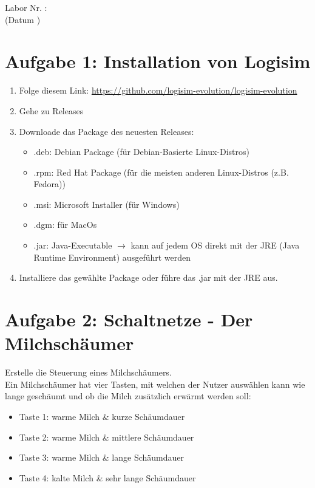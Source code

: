 \documentclass[a4paper]{scrartcl}
\def\header#1#2{
  \begin{center}
    {\Large Labor #1: \TOPIC}\\
    {(Datum #2)}
  \end{center}
}
\begin{document}
\header{Nr. \NUMBER}{\DATE}



\section*{Aufgabe 1: Installation von Logisim}
\begin{enumerate}
	\item Folge diesem Link: \href{https://github.com/logisim-evolution/logisim-evolution}{https://github.com/logisim-evolution/logisim-evolution}
	\item Gehe zu Releases
	\item Downloade das Package des neuesten Releases:
	\begin{itemize}
		\item .deb: Debian Package (für Debian-Basierte Linux-Distros)
		\item .rpm: Red Hat Package (für die meisten anderen Linux-Distros (z.B. Fedora))
		\item .msi: Microsoft Installer (für Windows)
		\item .dgm: für MacOs
		\item .jar: Java-Executable $\rightarrow$ kann auf jedem OS direkt mit der JRE (Java Runtime Environment) ausgeführt werden
	\end{itemize}
	\item Installiere das gewählte Package oder führe das .jar mit der JRE aus.
\end{enumerate}

\section*{Aufgabe 2: Schaltnetze - Der Milchschäumer}
Erstelle die Steuerung eines Milchschäumers. \\
Ein Milchschäumer hat vier Tasten, mit welchen der Nutzer auswählen kann wie lange geschäumt und ob die Milch zusätzlich erwärmt werden soll:
\begin{itemize}
	\item Taste 1: warme Milch \& kurze Schäumdauer
	\item Taste 2: warme Milch \& mittlere Schäumdauer
	\item Taste 3: warme Milch \& lange Schäumdauer
	\item Taste 4: kalte Milch \& sehr lange Schäumdauer
\end{itemize}
\end{document}
